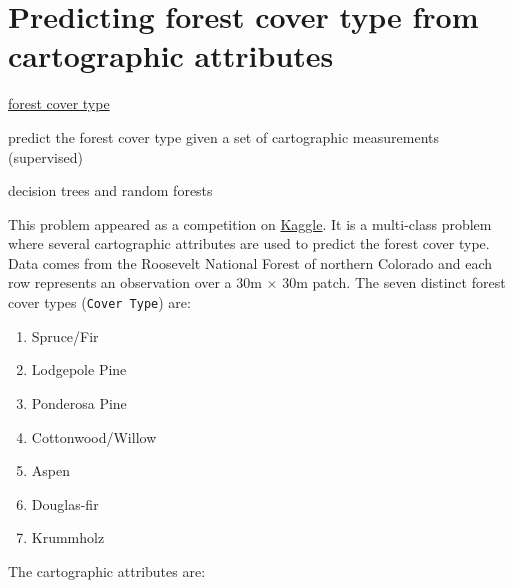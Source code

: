 \documentclass[a4paper,11pt]{article}
\begin{document}
\section{Predicting forest cover type from cartographic attributes}
\begin{framed}
\begin{description}[leftmargin=5em,style=nextline]\addtolength{\itemsep}{-0.2\baselineskip}
	\item[Data:] \href{https://archive.ics.uci.edu/ml/datasets/Covertype}{forest cover type}	
	\item[Task:] predict the forest cover type given a set of cartographic measurements (supervised)
	\item[Method:] decision trees and random forests
\end{description} 
\end{framed}

This problem appeared as a competition on \href{http://www.kaggle.com/c/forest-cover-type-prediction}{Kaggle}.
It is a multi-class problem where several cartographic attributes are used to predict the forest cover type.
Data comes from the Roosevelt National Forest of northern Colorado and each row represents an observation 
over a 30m $\times$ 30m  patch. The seven distinct forest cover types (\texttt{Cover Type}) are:

\begin{enumerate}\addtolength{\itemsep}{-0.3\baselineskip}
	\item Spruce/Fir
	\item Lodgepole Pine
	\item Ponderosa Pine
	\item Cottonwood/Willow
	\item Aspen
	\item Douglas-fir
	\item Krummholz
\end{enumerate}

The cartographic attributes are:
\end{document}
